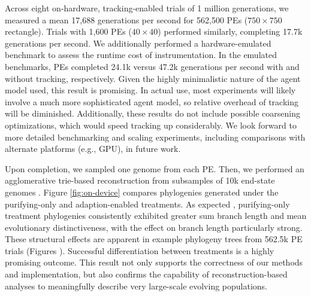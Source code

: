 Across eight on-hardware, tracking-enabled trials of 1 million generations, we measured a mean 17,688 generations per second for 562,500 PEs ($750\times750$ rectangle).
Trials with 1,600 PEs ($40\times40$) performed similarly, completing 17.7k generations per second.
We additionally performed a hardware-emulated benchmark to assess the runtime cost of instrumentation.
In the emulated benchmarks, PEs completed 24.1k versus 47.2k generations per second with and without tracking, respectively.
Given the highly minimalistic nature of the agent model used, this result is promising.
In actual use, most experiments will likely involve a much more sophisticated agent model, so relative overhead of tracking will be diminished.
Additionally, these results do not include possible coarsening optimizations, which would speed tracking up considerably.
We look forward to more detailed benchmarking and scaling experiments, including comparisons with alternate platforms (e.g., GPU), in future work.


Upon completion, we sampled one genome from each PE.
Then, we performed an agglomerative trie-based reconstruction from subsamples of 10k end-state genomes \cite{moreno2024analysis}.
Figure \ref{fig:on-device} compares phylogenies generated under the purifying-only and adaption-enabled treatments.
As expected \cite{moreno2023toward}, purifying-only treatment phylogenies consistently exhibited greater sum branch length and mean evolutionary distinctiveness, with the effect on branch length particularly strong.
These structural effects are apparent in example phylogeny trees from 562.5k PE trials (Figures ).
Successful differentiation between treatments is a highly promising outcome.
This result not only supports the correctness of our methods and implementation, but also confirms the capability of reconstruction-based analyses to meaningfully describe very large-scale evolving populations.
